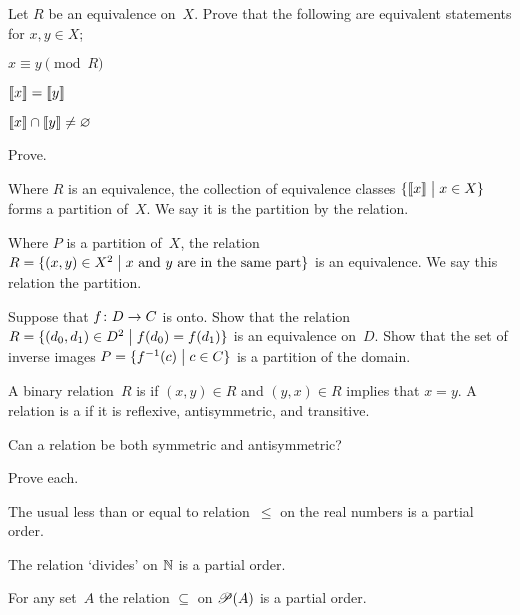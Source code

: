 \documentclass{ibl}
\begin{document}
\begin{center}
\end{center}

\begin{ex} Let $R$ be an equivalence on~$X$.
Prove that the following are equivalent statements for $x,y\in X$;
\begin{exes}
\item $x\equiv y\pmod R$
\item $\llbracket x \rrbracket=\llbracket y \rrbracket$    
\item $\llbracket x \rrbracket\cap\llbracket y \rrbracket\neq \varnothing$
\end{exes}
\end{ex}

\begin{ex} Prove.
\begin{exes}
\item Where $R$ is an equivalence, 
  the collection of equivalence classes 
  $\{\llbracket x \rrbracket \bigm| x\in X\}$ forms a partition of~$X$.
  We say it is the partition  by the relation.
\item Where $P$ is a partition of~$X$, 
  the relation $R=\{(x,y)\in X^2 \bigm| \text{$x$ and~$y$ are in the same part}\}$ 
  is an equivalence.
  We say this relation  the partition. 
\end{exes}
\end{ex}

\begin{ex}
Suppose that $\mbox{$f\colon D\to C$}$ is onto.
Show that the relation
$R=\{(d_0,d_1)\in D^2 \bigm| f(d_0)=f(d_1)\}$ 
is an equivalence on~$D$. 
Show that the set of inverse images 
$P=\{f^{-1}(c) \bigm| c\in C\}$ is a partition of the domain.
\end{ex}

\begin{df}
A binary relation~$R$ is  if
$(x,y)\in R$ and $(y,x)\in R$ implies that $x=y$.
A relation is a  if it is 
reflexive, antisymmetric, and transitive.  
\end{df}

\begin{ex}
Can a relation be both symmetric and antisymmetric?  
\end{ex}

\begin{ex} Prove each.
\begin{exes}
\item The usual less than or equal to relation~$\leq$ on 
the real numbers is a partial order.
\item The relation `divides' on $\mathbb{N}$ is a partial order.
\item For any set~$A$ the relation $\subseteq$ on $\mathscr{P}(A)$ is
a partial order.
\end{exes}
\end{ex}
\end{document}

